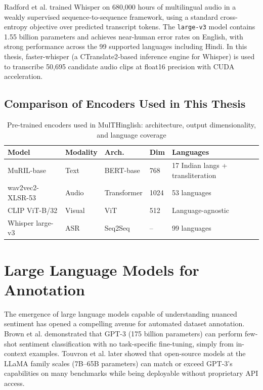 Radford et al. \cite{radford2023whisper} trained Whisper on 680,000 hours of multilingual audio in a weakly supervised sequence-to-sequence framework, using a standard cross-entropy objective over predicted transcript tokens. The \texttt{large-v3} model contains 1.55 billion parameters and achieves near-human error rates on English, with strong performance across the 99 supported languages including Hindi. In this thesis, faster-whisper (a CTranslate2-based inference engine for Whisper) is used to transcribe 50,695 candidate audio clips at float16 precision with CUDA acceleration.

\subsection{Comparison of Encoders Used in This Thesis}

\begin{table}[ht]
\centering
\caption{Pre-trained encoders used in MulTHinglish: architecture, output dimensionality, and language coverage}
\label{tab:encoders}
\renewcommand{\arraystretch}{1.3}
\begin{tabular}{lllll}
\toprule
\textbf{Model} & \textbf{Modality} & \textbf{Arch.} & \textbf{Dim} & \textbf{Languages} \\
\midrule
MuRIL-base \cite{khanuja2021muril}          & Text   & BERT-base   & 768   & 17 Indian langs + transliteration \\
wav2vec2-XLSR-53 \cite{conneau2021xlsr}     & Audio  & Transformer & 1024  & 53 languages \\
CLIP ViT-B/32 \cite{radford2021clip}        & Visual & ViT         & 512   & Language-agnostic \\
Whisper large-v3 \cite{radford2023whisper}  & ASR    & Seq2Seq     & --    & 99 languages \\
\bottomrule
\end{tabular}
\end{table}

\section{Large Language Models for Annotation}

The emergence of large language models capable of understanding nuanced sentiment has opened a compelling avenue for automated dataset annotation. Brown et al. \cite{brown2020gpt3} demonstrated that GPT-3 (175 billion parameters) can perform few-shot sentiment classification with no task-specific fine-tuning, simply from in-context examples. Touvron et al. \cite{touvron2023llama} later showed that open-source models at the LLaMA family scales (7B--65B parameters) can match or exceed GPT-3's capabilities on many benchmarks while being deployable without proprietary API access.


